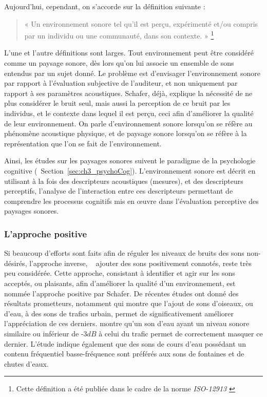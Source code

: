 Aujourd'hui, cependant, on s'accorde sur la définition suivante \citep{aletta2016soundscape}:

\begin{quote}
« Un environnement sonore tel qu'il est perçu, expérimenté et/ou compris par un individu ou une communauté, dans son contexte. » \footnote{Cette définition a été publiée dans le cadre de la norme \emph{ISO-12913} \citep{iso12913}}
\end{quote}

L'une et l'autre définitions sont larges. Tout environnement peut être considéré comme un paysage sonore, dès lors qu'on lui associe un ensemble de sons entendus par un sujet donné. Le problème est d'envisager l’environnement sonore par rapport à l'évaluation subjective de l'auditeur, et non uniquement par rapport à ses paramètres acoustiques. Schafer, déjà, explique la nécessité de ne plus considérer le bruit seul, mais aussi la perception de ce bruit par les individus, et le contexte dans lequel il est perçu, ceci afin d'améliorer la qualité de leur environnement. On parle d'environnement sonore lorsqu'on se réfère au phénomène acoustique physique, et de paysage sonore lorsqu'on se réfère à la représentation que l'on se fait de l'environnement.

Ainsi, les études sur les paysages sonores suivent le paradigme de la psychologie cognitive \citep{dubois2006cognitive,maffiolo_caracterisation_1999} (\cf~Section~\ref{sec:ch3_psychoCog}). L'environnement sonore est décrit en utilisant à la fois des descripteurs acoustiques (mesures), et des descripteurs perceptifs, l'analyse de l'interaction entre ces descripteurs permettant de comprendre les processus cognitifs mis en œuvre dans l'évaluation perceptive des paysages sonores.

\subsubsection{L'approche positive}

Si beaucoup d’efforts sont faits afin de réguler les niveaux de bruits des sons non-désirés, l'approche inverse, \ie~ ajouter des sons positivement connotés, reste très peu considérée. Cette approche, consistant à identifier et agir sur les sons acceptés, ou plaisants, afin d'améliorer la qualité d'un environnement, est nommée l'approche positive par Schafer. De récentes études ont donné des résultats prometteurs, notamment \citep{hong2013designing} qui montre que l'ajout de sons d'oiseaux, ou d'eau, à des sons de trafics urbain, permet de significativement améliorer l'appréciation de ces derniers. \citep{galbrun2012perceptual} montre qu'un son d'eau ayant un niveau sonore similaire ou inférieur de -3$dB$ à celui du trafic permet de correctement masquer ce dernier. L'étude indique également que des sons de cours d'eau possédant un contenu fréquentiel basse-fréquence sont préférés aux sons de fontaines et de chutes d'eaux.

